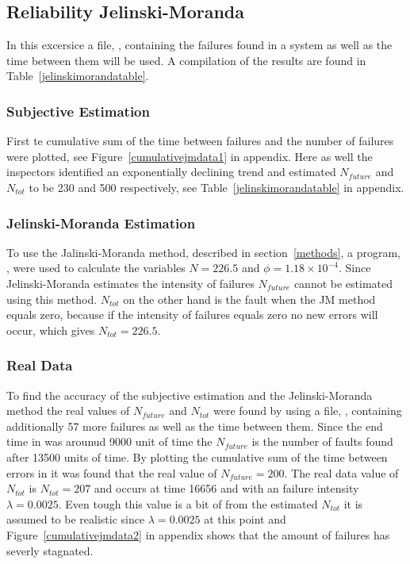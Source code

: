 \subsection{Reliability Jelinski-Moranda}
In this excersice a file, , containing the failures found in a system as well as the time between them will be used.
A compilation of the results are found in Table~\ref{jelinskimorandatable}.

\subsubsection*{Subjective Estimation} 
First te cumulative sum of the time between failures and the number of failures were plotted, see Figure~\ref{cumulativejmdata1} in appendix. Here as well the inspectors identified an exponentially declining trend and estimated $N_{future}$ and $N_{tot}$ to be 230 and 500 respectively, see Table~\ref{jelinskimorandatable} in appendix.

\subsubsection*{Jelinski-Moranda Estimation}
To use the Jalinski-Moranda method, described in section~\ref{methods}, a program, , were used to calculate the variables $N=226.5$ and $\phi=1.18\times10^{-4}$. Since Jelinski-Moranda estimates the intensity of failures $N_{future}$ cannot be estimated using this method.
$N_{tot}$ on the other hand is the fault when the JM method equals zero, because if the intensity of failures equals zero no new errors will occur, which gives $N_{tot}=226.5$.

\subsubsection*{Real Data}
To find the accuracy of the subjective estimation and the Jelinski-Moranda method the real values of $N_{future}$ and $N_{tot}$ were found by using a file, , containing additionally 57 more failures as well as the time between them. Since the end time in  was arounud 9000 unit of time the $N_{future}$ is the number of faults found after 13500 units of time. By plotting the cumulative sum of the time between errors in  it was found that the real value of $N_{future}=200$. The real data value of $N_{tot}$ is $N_{tot}=207$ and occurs at time 16656 and with an failure intensity $\lambda=0.0025$. Even tough this value is a bit of from the estimated $N_{tot}$ it is assumed to be realistic since $\lambda=0.0025$ at this point and Figure~\ref{cumulativejmdata2} in appendix shows that the amount of failures has severly stagnated.

